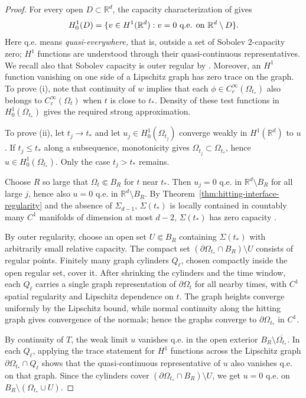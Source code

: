 \documentclass[11pt]{amsart}
\numberwithin{equation}{section}
\numberwithin{figure}{section}
\theoremstyle{plain}
\theoremstyle{definition}
\theoremstyle{remark}
\theoremstyle{plain}
\def\R{\mathbb{R}}
\begin{document}
\begin{proof}
For every open \(D\subset\R^d\), the capacity characterization of
\cite[Thm.~9.1.3]{AdamsHedberg} gives
\begin{equation}\label{eq:h10-qe-characterization}
    H^1_0(D)=\{v\in H^1(\R^d):v=0\hbox{ q.e. on }\R^d\setminus D\}.
\end{equation}
Here q.e. means {\it quasi-everywhere,} that is, outside a set of Sobolev
\(2\)-capacity zero; \(H^1\) functions are understood through their
quasi-continuous representatives.  We recall also that Sobolev capacity is outer regular by
\cite[Prop.~2.3.5]{AdamsHedberg}.  Moreover, an \(H^1\) function vanishing on
one side of a Lipschitz graph has zero trace on the graph.
To prove (i), note that continuity of $w$ implies that each $\phi\in C_c^\infty(\Omega_{t_*})$ also belongs to $C_c^\infty(\Omega_t)$ when $t$ is close to $t_*$. Density of these test functions in $H^1_0(\Omega_{t_*})$ gives the required strong approximation.

To prove (ii), let $t_j\to t_*$ and let $u_j\in H^1_0(\Omega_{t_j})$ converge weakly in $H^1(\R^d)$ to $u$. If $t_j\leq t_*$ along a subsequence, monotonicity gives $\Omega_{t_j}\subset\Omega_{t_*}$, hence $u\in H^1_0(\Omega_{t_*})$. Only the case $t_j>t_*$ remains.

Choose $R$ so large that $\Omega_t\Subset B_R$ for $t$ near $t_*$. Then $u_j=0$ q.e. in $\R^d\setminus B_R$ for all large $j$, hence also $u=0$ q.e. in $\R^d\setminus B_R$. By Theorem~\ref{thm:hitting-interface-regularity} and the absence of \(\Sigma_{d-1}\), \(\Sigma(t_*)\) is locally contained in countably many \(C^1\) manifolds of dimension at most \(d-2\), $\Sigma(t_*)$ has zero capacity \cite[Cor. 5.1.15]{AdamsHedberg}.

By outer regularity, choose an open set $U\Subset B_R$ containing $\Sigma(t_*)$ with arbitrarily small relative capacity. The compact set $(\partial\Omega_{t_*}\cap B_R)\setminus U$ consists of regular points. Finitely many graph cylinders $Q_\ell$, chosen compactly inside the open regular set, cover it. After shrinking the cylinders and the time window, each $Q_\ell$ carries a single graph representation of $\partial\Omega_t$ for all nearby times, with $C^1$ spatial regularity and Lipschitz dependence on $t$. The graph heights converge uniformly by the Lipschitz bound, while normal continuity along the hitting graph gives convergence of the normals; hence the graphs converge to $\partial\Omega_{t_*}$ in $C^1$.

By continuity of $T$, the weak limit $u$ vanishes q.e. in the open exterior
$B_R\setminus\overline{\Omega_{t_*}}$. In each $Q_\ell$, applying the trace
statement for $H^1$ functions across the Lipschitz graph
$\partial\Omega_{t_*}\cap Q_\ell$ shows that the quasi-continuous representative
of $u$ also vanishes q.e. on that graph. Since the cylinders cover
$(\partial\Omega_{t_*}\cap B_R)\setminus U$, we get $u=0$ q.e. on
$B_R\setminus(\Omega_{t_*}\cup U)$.


\end{proof}
\end{document}
